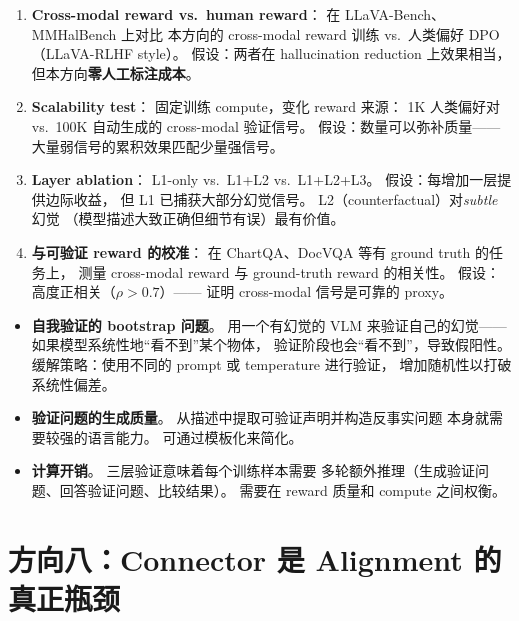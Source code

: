 \documentclass[12pt,a4paper]{article}
\begin{document}
\begin{expbox}
\begin{enumerate}[leftmargin=1.5em]
  \item \textbf{Cross-modal reward vs.\ human reward}：
    在 LLaVA-Bench、MMHalBench 上对比
    本方向的 cross-modal reward 训练
    vs.\ 人类偏好 DPO（LLaVA-RLHF style）。
    假设：两者在 hallucination reduction 上效果相当，
    但本方向\textbf{零人工标注成本}。

  \item \textbf{Scalability test}：
    固定训练 compute，变化 reward 来源：
    1K 人类偏好对 vs.\ 100K 自动生成的 cross-modal 验证信号。
    假设：数量可以弥补质量——
    大量弱信号的累积效果匹配少量强信号。

  \item \textbf{Layer ablation}：
    L1-only vs.\ L1+L2 vs.\ L1+L2+L3。
    假设：每增加一层提供边际收益，
    但 L1 已捕获大部分幻觉信号。
    L2（counterfactual）对\textit{subtle} 幻觉
    （模型描述大致正确但细节有误）最有价值。

  \item \textbf{与可验证 reward 的校准}：
    在 ChartQA、DocVQA 等有 ground truth 的任务上，
    测量 cross-modal reward 与 ground-truth reward 的相关性。
    假设：高度正相关（$\rho > 0.7$）——
    证明 cross-modal 信号是可靠的 proxy。
\end{enumerate}
\end{expbox}

\begin{riskbox}
\begin{itemize}[leftmargin=1.5em]
  \item \textbf{自我验证的 bootstrap 问题}。
    用一个有幻觉的 VLM 来验证自己的幻觉——
    如果模型系统性地``看不到''某个物体，
    验证阶段也会``看不到''，导致假阳性。
    缓解策略：使用不同的 prompt 或 temperature 进行验证，
    增加随机性以打破系统性偏差。
  \item \textbf{验证问题的生成质量}。
    从描述中提取可验证声明并构造反事实问题
    本身就需要较强的语言能力。
    可通过模板化来简化。
  \item \textbf{计算开销}。
    三层验证意味着每个训练样本需要
    多轮额外推理（生成验证问题、回答验证问题、比较结果）。
    需要在 reward 质量和 compute 之间权衡。
\end{itemize}
\end{riskbox}


\newpage
\section{方向八：Connector 是 Alignment 的真正瓶颈}
\label{sec:prop8}
\end{document}
